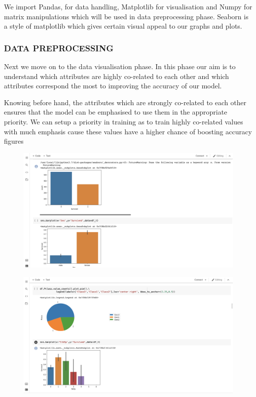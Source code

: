 \documentclass[12pt]{article}
\newcommand{\nd}{\noindent}
\begin{document}
\nd We import Pandas, for data handling, Matplotlib for visualisation and Numpy for matrix manipulations which will be used in data preprocessing phase. Seaborn is a style of matplotlib which gives certain visual appeal to our graphs and plots. 
\newpage
\subsubsection{\textbf{DATA PREPROCESSING}}
Next we move on to the data visualisation phase. In this phase our aim is to understand which attributes are highly co-related to each other and which attributes correspond the most to improving the accuracy of our model. 

\nd Knowing before hand, the attributes which are strongly co-related to each other ensures that the model can be emphasised to use them in the appropriate priority. We can setup a priority in training as to train highly co-related values with much emphasis cause these values have a higher chance of boosting accuracy figures 
\vspace{10mm}
\hspace{-5mm}
\begin{figure}[h]
\centering
\begin{minipage}{.5\textwidth}
  \centering
  \includegraphics[width=1.2\linewidth]{part3.png}
  \label{fig:test1}
\end{minipage}%
\begin{minipage}{.5\textwidth}
  \centering
  \includegraphics[width=1.2\linewidth]{part4.png}
  \label{fig:test2}
\end{minipage}
\end{figure}
\end{document}
